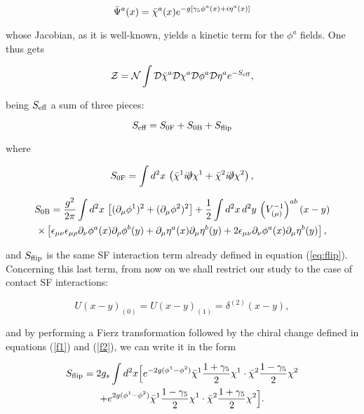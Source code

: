 \documentclass[a4paper,a4paper]{article}
\begin{document}
\begin{equation} \label{f2}
\bar{\Psi}^a(x) = \bar{\chi}^a(x) e^{-g[\gamma_5 \phi^a(x) + i\eta^a(x)]}
\end{equation}

\noindent whose Jacobian, as it is well-known, yields a kinetic term for the $\phi^a$
fields. One thus gets

\begin{equation}
\mathcal{Z}=\mathcal{N}\int\mathcal{D}\bar{\chi}^a\mathcal{D}\chi^a\mathcal{D}\phi^a\mathcal{D}\eta^a e^{-S_{\text{eff}}},
\end{equation}

\noindent being $S_{\text{eff}}$ a sum of three pieces:

\begin{equation}
S_{\text{eff}}=S_{0\text{F}}+S_{0\text{B}}+S_{\text{flip}}
\end{equation}

\noindent where

\begin{equation}
S\ferm=\int d^2x\,\left(\chiB^1 i\slp \chi^1 + \chiB^2 i\slp \chi^2\right),
\end{equation}

\begin{multline}
S_{0\text{B}}=\frac{g^2}{2\pi}\int d^2x\,\left[(\partial_\mu\phi^1)^2+(\partial_\mu\phi^2)^2\right]
+\frac{1}{2}\int d^2x\,d^2y\,\left(V^{-1}_{(\mu)}\right)^{ab}(x-y)\\
\times\left[\epsilon_{\mu\nu}\epsilon_{\mu\rho}\partial_\nu\phi^a(x)\partial_\rho\phi^b(y)
+\partial_\mu\eta^a(x)\partial_\mu\eta^b(y) +
2\epsilon_{\mu\nu}\partial_\nu\phi^a(x)\partial_\mu\eta^b(y)\right],
\end{multline}

\noindent and $S_{\text{flip}}$ is the same SF interaction term already defined in equation
(\ref{eq:flip}). Concerning this last term, from now on we shall restrict our study to
the case of contact SF interactions:

\begin{equation}
U(x-y)_{(0)}=U(x-y)_{(1)}=\delta^{(2)}(x-y),
\end{equation}

\noindent and by performing a Fierz transformation followed by the chiral change defined in equations (\ref{f1}) and
(\ref{f2}), we can write it in the form

\begin{multline}
S_{\text{flip}}=2 g_s\int d^2x\Big[
e^{-2g(\phi^1-\phi^2)}\bar{\chi}^1\frac{1+\gamma_5}{2}\chi^1\cdot
\bar{\chi}^2\frac{1-\gamma_5}{2}\chi^2 \\+
e^{2g(\phi^1-\phi^2)}\bar{\chi}^1\frac{1-\gamma_5}{2}\chi^1\cdot
\bar{\chi}^2\frac{1+\gamma_5}{2}\chi^2\Big].
\end{multline}
\end{document}
